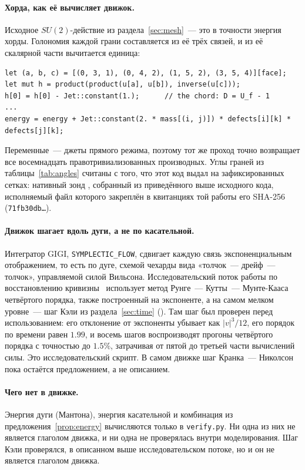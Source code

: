 \paragraph{Хорда, как её вычисляет движок.} Исходное $SU(2)$-действие из
раздела~\ref{sec:mesh}~--- это в точности энергия хорды. Голономия каждой грани составляется из её
трёх связей, и из её скалярной части вычитается единица:
\begin{lstlisting}[style=rust]
let (a, b, c) = [(0, 3, 1), (0, 4, 2), (1, 5, 2), (3, 5, 4)][face];
let mut h = product(product(u[a], u[b]), inverse(u[c]));
h[0] = h[0] - Jet::constant(1.);      // the chord: D = U_f - 1
...
energy = energy + Jet::constant(2. * mass[(i, j)]) * defects[i][k] * defects[j][k];
\end{lstlisting}
Переменные~--- джеты прямого режима, поэтому тот же проход точно возвращает все восемнадцать
правотривиализованных производных. Углы граней из таблицы~\ref{tab:angles} считаны с того, что этот
код выдал на зафиксированных сетках: нативный зонд ,
собранный из приведённого выше исходного кода, исполняемый файл которого закреплён в квитанциях той работы его
SHA-256 (\texttt{71fb30db\ldots}).

\paragraph{Движок шагает вдоль дуги, а не по касательной.} Интегратор GIGI,
\texttt{SYMPLECTIC\_FLOW}, сдвигает каждую связь экспоненциальным отображением, то есть по дуге,
схемой чехарды вида «толчок~--- дрейф~--- толчок», управляемой силой Вильсона. Исследовательский поток
работы по восстановлению кривизны~\cite{davis-rtc} использует метод Рунге~--- Кутты~--- Мунте-Кааса
четвёртого порядка, также построенный на экспоненте, а на самом мелком уровне~--- шаг Кэли из
раздела~\ref{sec:time} (). Там шаг был
проверен перед использованием: его отклонение от экспоненты убывает как $|v|^3/12$, его порядок по
времени равен $1.99$, и восемь шагов воспроизводят прогоны четвёртого порядка с точностью до $1.5\%$,
затрачивая от пятой до третьей части вычислений силы. Это исследовательский скрипт. В самом движке
шаг Кранка~--- Николсон пока остаётся предложением, а не описанием.

\paragraph{Чего нет в движке.} Энергия дуги (Мантона), энергия касательной и
комбинация из предложения~\ref{prop:energy} вычисляются только в \texttt{verify.py}. Ни одна из них
не является глаголом движка, и ни одна не проверялась внутри моделирования. Шаг Кэли проверялся, в
описанном выше исследовательском потоке, но и он не является глаголом движка.

